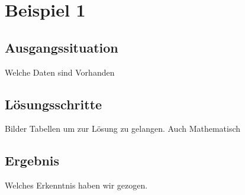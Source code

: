 \section{Beispiel 1}
\label{sec:beispiel1}


\subsection{Ausgangssituation} 
\label{sec:ausgangssituation1}
Welche Daten sind Vorhanden 


\subsection{Lösungsschritte} 
\label{sec:loesungen1}
Bilder Tabellen um zur Lösung zu gelangen. Auch Mathematisch

\subsection{Ergebnis} 
\label{sec:ergebnis1}
Welches Erkenntnis haben wir gezogen.


